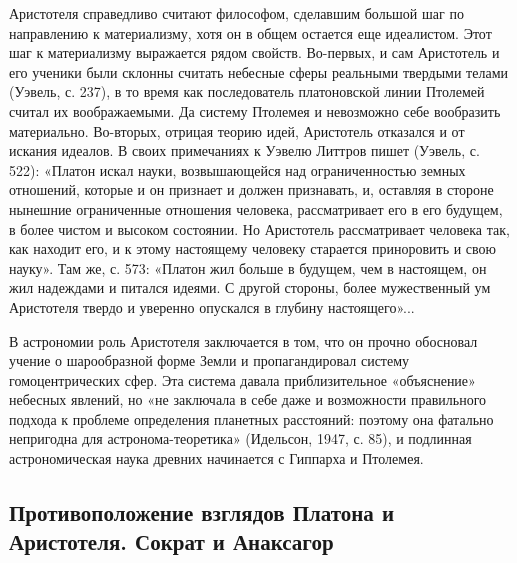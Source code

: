 Аристотеля  справедливо считают  философом, сделавшим  большой шаг  по
направлению к материализму,  хотя он в общем  остается еще идеалистом.
Этот шаг  к материализму  выражается рядом  свойств. Во-первых,  и сам
Аристотель и его ученики были склонны считать небесные сферы реальными
твердыми  телами  (Уэвель,  с.  237), в  то  время  как  последователь
платоновской  линии  Птолемей  считал  их  воображаемыми.  Да  систему
Птолемея и невозможно себе  вообразить материально. Во-вторых, отрицая
теорию  идей,  Аристотель отказался  и  от  искания идеалов.  В  своих
примечаниях к  Уэвелю Литтров  пишет (Уэвель,  с. 522):  «Платон искал
науки, возвышающейся  над ограниченностью земных отношений,  которые и
он  признает  и должен  признавать,  и,  оставляя в  стороне  нынешние
ограниченные отношения  человека, рассматривает  его в его  будущем, в
более чистом и высоком состоянии. Но Аристотель рассматривает человека
так,  как  находит  его,  и  к  этому  настоящему  человеку  старается
приноровить  и свою  науку».  Там же,  с. 573:  «Платон  жил больше  в
будущем, чем в настоящем, он жил  надеждами и питался идеями. С другой
стороны, более мужественный ум  Аристотеля твердо и уверенно опускался
в глубину настоящего»...

В  астрономии  роль  Аристотеля  заключается  в  том,  что  он  прочно
обосновал учение о шарообразной  форме Земли и пропагандировал систему
гомоцентрических сфер. Эта система давала приблизительное «объяснение»
небесных  явлений,  но  «не  заключала   в  себе  даже  и  возможности
правильного  подхода  к  проблеме  определения  планетных  расстояний:
поэтому  она фатально  непригодна для  астронома-теоретика» (Идельсон,
1947, с. 85),  и подлинная астрономическая наука  древних начинается с
Гиппарха и Птолемея.

\subsection{Противоположение взглядов  Платона и Аристотеля.  Сократ и
Анаксагор}

